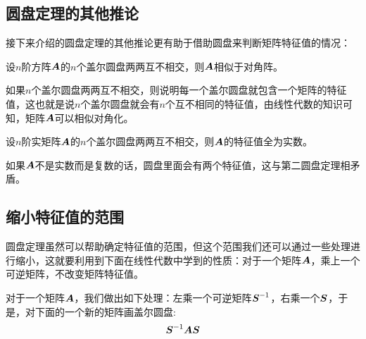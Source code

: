 \documentclass[12pt, a4paper, oneside, UTF8]{ctexbook}
\begin{document}
\subsection{圆盘定理的其他推论}
接下来介绍的圆盘定理的其他推论更有助于借助圆盘来判断矩阵特征值的情况：
\begin{corollary}{}{}
    设$n$阶方阵$\boldsymbol{A}$的$n$个盖尔圆盘两两互不相交，则$\boldsymbol{A}$相似于对角阵。
\end{corollary}
如果$n$个盖尔圆盘两两互不相交，则说明每一个盖尔圆盘就包含一个矩阵的特征值，这也就是说$n$个盖尔圆盘就会有$n$个互不相同的特征值，由线性代数的知识可知，矩阵$\boldsymbol{A}$可以相似对角化。
\begin{corollary}{}{}
    设$n$阶实矩阵$\boldsymbol{A}$的$n$个盖尔圆盘两两互不相交，则$\boldsymbol{A}$的特征值全为实数。
\end{corollary}
如果$\boldsymbol{A}$不是实数而是复数的话，圆盘里面会有两个特征值，这与第二圆盘定理相矛盾。
\subsection{缩小特征值的范围}
圆盘定理虽然可以帮助确定特征值的范围，但这个范围我们还可以通过一些处理进行缩小，这就要利用到下面在线性代数中学到的性质：对于一个矩阵$\boldsymbol{A}$，乘上一个可逆矩阵，不改变矩阵特征值。

对于一个矩阵$\boldsymbol{A}$，我们做出如下处理：左乘一个可逆矩阵$\boldsymbol{S}^{-1}$，右乘一个$\boldsymbol{S}$，于是，对下面的一个新的矩阵画盖尔圆盘:\[\boldsymbol{S}^{-1}\boldsymbol{A}\boldsymbol{S}\]
\end{document}
